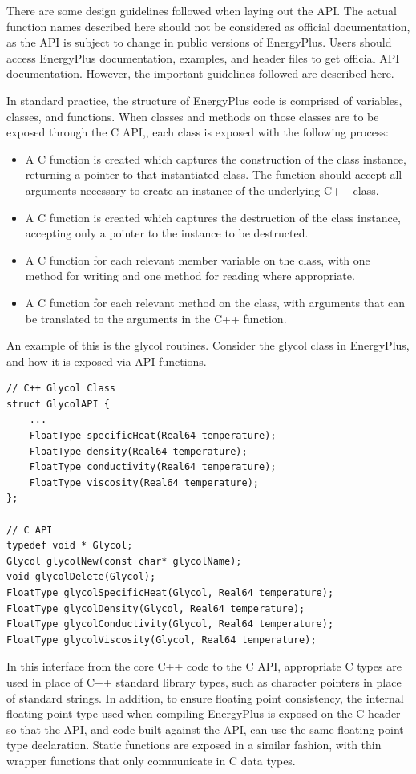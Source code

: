 \documentclass[5p, authoryear]{elsarticle}
\begin{document}
There are some design guidelines followed when laying out the API.  The actual function names described here should not be considered as official documentation, as the API is subject to change in public versions of EnergyPlus.  Users should access EnergyPlus documentation, examples, and header files to get official API documentation.  However, the important guidelines followed are described here.

In standard practice, the structure of EnergyPlus code is comprised of variables, classes, and functions.  When classes and methods on those classes are to be exposed through the C API,, each class is exposed with the following process:
\begin{itemize}
 \item A C function is created which captures the construction of the class instance, returning a pointer to that instantiated class.  The function should accept all arguments necessary to create an instance of the underlying C++ class.
 \item A C function is created which captures the destruction of the class instance, accepting only a pointer to the instance to be destructed.
 \item A C function for each relevant member variable on the class, with one method for writing and one method for reading where appropriate.  
 \item A C function for each relevant method on the class, with arguments that can be translated to the arguments in the C++ function.
\end{itemize}

An example of this is the glycol routines.  Consider the glycol class in EnergyPlus, and how it is exposed via API functions.

\lstset{language=c}
\begin{lstlisting}
// C++ Glycol Class
struct GlycolAPI {
    ...
    FloatType specificHeat(Real64 temperature);
    FloatType density(Real64 temperature);
    FloatType conductivity(Real64 temperature);
    FloatType viscosity(Real64 temperature);
};

// C API
typedef void * Glycol;
Glycol glycolNew(const char* glycolName);
void glycolDelete(Glycol);
FloatType glycolSpecificHeat(Glycol, Real64 temperature);
FloatType glycolDensity(Glycol, Real64 temperature);
FloatType glycolConductivity(Glycol, Real64 temperature);
FloatType glycolViscosity(Glycol, Real64 temperature);
\end{lstlisting}

In this interface from the core C++ code to the C API, appropriate C types are used in place of C++ standard library types, such as character pointers in place of standard strings.  In addition, to ensure floating point consistency, the internal floating point type used when compiling EnergyPlus is exposed on the C header so that the API, and code built against the API, can use the same floating point type declaration.  Static functions are exposed in a similar fashion, with thin wrapper functions that only communicate in C data types.
\end{document}
